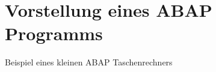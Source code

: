 \section{Vorstellung eines ABAP Programms}

\begin{listing}[ht]{}
    \caption{Beispiel eines kleinen ABAP Taschenrechners}
    \label{listing:abap_taschenrechner}
\end{listing}

\newpage